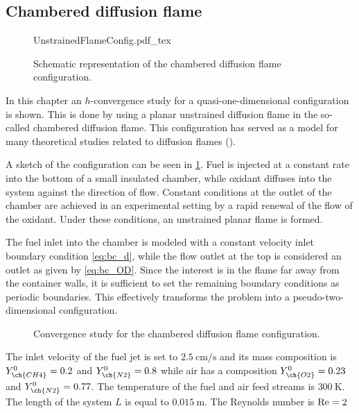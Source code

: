 \subsection{Chambered diffusion flame}\label{ss:UDF}
\begin{figure}[h]
	\begin{center}
		\def\svgwidth{0.4\textwidth}
		{UnstrainedFlameConfig.pdf_tex}
		\caption{Schematic representation of the chambered diffusion flame configuration. }
		\label{fig:chamberedDifFlame}
	\end{center}
\end{figure}
In this chapter an $h$-convergence study for a quasi-one-dimensional configuration is shown. This is done by using a planar unstrained diffusion flame in the so-called chambered diffusion flame. This configuration has served as a model for many theoretical studies related to diffusion flames (\textcite{matalonDiffusionFlamesChamber1980,rameauNumericalBifurcationChambered1985,matalonEffectThermalExpansion2010}). 

A sketch of the configuration can be seen in \cref{fig:chamberedDifFlame}. Fuel is injected at a constant rate into the bottom of a small insulated chamber, while oxidant diffuses into the system against the direction of flow. Constant conditions at the outlet of the chamber are achieved in an experimental setting by a rapid renewal of the flow of the oxidant. Under these conditions, an unstrained planar flame is formed.

The fuel inlet into the chamber is modeled with a constant velocity inlet boundary condition \cref{eq:bc_d}, while the flow outlet at the top is considered an outlet as given by \cref{eq:bc_OD}. Since the interest is in the flame far away from the container walls, it is sufficient to set the remaining boundary conditions as periodic boundaries. This effectively transforms the problem into a pseudo-two-dimensional configuration.

\begin{figure}[t!]
	\centering
	\pgfplotsset{width=0.34\textwidth, compat=1.3}
	\caption{Convergence study for the chambered diffusion flame configuration.}
	\label{ConvergenceDiffFlame}
\end{figure}
The inlet velocity of the fuel jet is set to $\SI{2.5}{\centi\meter \per \second}$ and its mass composition is $Y^0_{\ch{CH4}} = 0.2$ and $Y^0_{\ch{N2}} = 0.8$ while air has a composition $Y^0_{\ch{O2}} = 0.23$ and $Y^0_{\ch{N2}} = 0.77$. The temperature of the fuel and air feed streams is $\SI{300}{\kelvin}$. The length of the system $L$ is equal to $\SI{0.015}{\meter}$. The Reynolds number is $\text{Re} = 2$

